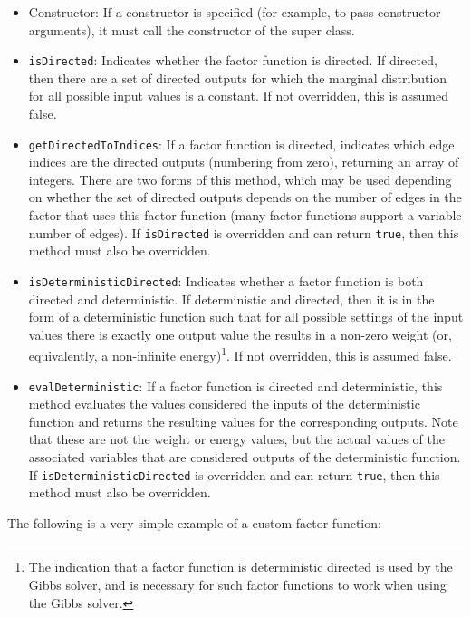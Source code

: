 \begin{itemize}
%
\item Constructor: If a constructor is specified (for example, to pass constructor arguments), it must call the constructor of the super class.
\item \texttt{isDirected}: Indicates whether the factor function is directed.  If directed, then there are a set of directed outputs for which the marginal distribution for all possible input values is a constant.  If not overridden, this is assumed false.
%
\item \texttt{getDirectedToIndices}: If a factor function is directed, indicates which edge indices are the directed outputs (numbering from zero), returning an array of integers.  There are two forms of this method, which may be used depending on whether the set of directed outputs depends on the number of edges in the factor that uses this factor function (many factor functions support a variable number of edges).  If \texttt{isDirected} is overridden and can return \texttt{true}, then this method must also be overridden.
%
\item \texttt{isDeterministicDirected}: Indicates whether a factor function is both directed and deterministic.  If deterministic and directed, then it is in the form of a deterministic function such that for all possible settings of the input values there is exactly one output value the results in a non-zero weight (or, equivalently, a non-infinite energy)\footnote{The indication that a factor function is deterministic directed is used by the Gibbs solver, and is necessary for such factor functions to work when using the Gibbs solver.}.  If not overridden, this is assumed false.
%
\item \texttt{evalDeterministic}: If a factor function is directed and deterministic, this method evaluates the values considered the inputs of the deterministic function and returns the resulting values for the corresponding outputs.  Note that these are not the weight or energy values, but the actual values of the associated variables that are considered outputs of the deterministic function.  If \texttt{isDeterministicDirected} is overridden and can return \texttt{true}, then this method must also be overridden.
%
\end{itemize}

The following is a very simple example of a custom factor function:

